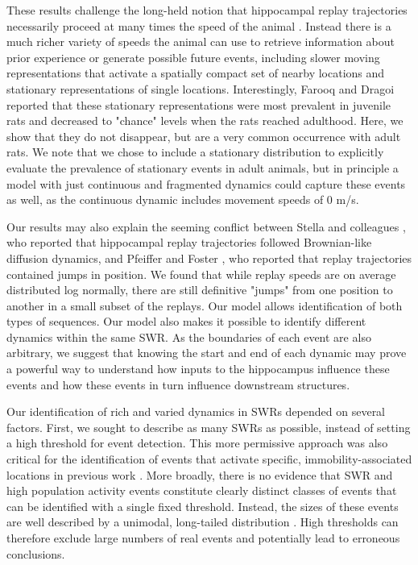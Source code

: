 \documentclass[times, twoside]{zHenriquesLab-StyleBioRxiv}
\begin{document}
These results challenge the long-held notion that hippocampal replay trajectories necessarily proceed at many times the speed of the animal \cite{NadasdyReplayTimeCompression1999, LeeMemorySequentialExperience2002, DavidsonHippocampalReplayExtended2009}. Instead there is a much richer variety of speeds the animal can use to retrieve information about prior experience or generate possible future events, including slower moving representations that activate a spatially compact set of nearby locations and stationary representations of single locations. Interestingly, Farooq and Dragoi \cite{FarooqEmergencepreconfiguredplastic2019} reported that these stationary representations were most prevalent in juvenile rats and decreased to "chance" levels when the rats reached adulthood. Here, we show that they do not disappear, but are a very common occurrence with adult rats. We note that we chose to include a stationary distribution to explicitly evaluate the prevalence of stationary events in adult animals, but in principle a model with just continuous and fragmented dynamics could capture these events as well, as the continuous dynamic includes movement speeds of 0 m/s.

Our results may also explain the seeming conflict between Stella and colleagues \cite{StellaHippocampalReactivationRandom2019}, who reported that hippocampal replay trajectories followed Brownian-like diffusion dynamics, and Pfeiffer and Foster \cite{PfeifferAutoassociativedynamicsgeneration2015}, who reported that replay trajectories contained jumps in position. We found that while replay speeds are on average distributed log normally, there are still definitive "jumps" from one position to another in a small subset of the replays. Our model allows identification of both types of sequences. Our model also makes it possible to identify different dynamics within the same SWR. As the boundaries of each event are also arbitrary, we suggest that knowing the start and end of each dynamic may prove a powerful way to understand how inputs to the hippocampus influence these events and how these events in turn influence downstream structures.

Our identification of rich and varied dynamics in SWRs depended on several factors. First, we sought to describe as many SWRs as possible, instead of setting a high threshold for event detection. This more permissive approach was also critical for the identification of events that activate specific, immobility-associated locations in previous work \cite{JaiDistincthippocampalcorticalmemory2017}. More broadly, there is no evidence that SWR and high population activity events constitute clearly distinct classes of events that can be identified with a single fixed threshold. Instead, the sizes of these events are well described by a unimodal, long-tailed distribution \cite{ChengNewExperiencesEnhance2008}. High thresholds can therefore exclude large numbers of real events and potentially lead to erroneous conclusions. 
\end{document}
